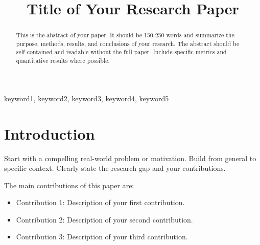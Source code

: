 \documentclass[10pt,conference]{IEEEtran}
\begin{document}
\title{Title of Your Research Paper}

\author{
\and
{}
}

\maketitle

\begin{abstract}
This is the abstract of your paper. It should be 150-250 words and summarize the 
purpose, methods, results, and conclusions of your research. The abstract should 
be self-contained and readable without the full paper. Include specific metrics 
and quantitative results where possible.
\end{abstract}

\begin{IEEEkeywords}
keyword1, keyword2, keyword3, keyword4, keyword5
\end{IEEEkeywords}

\IEEEpeerreviewmaketitle

\section{Introduction}
\label{sec:introduction}

Start with a compelling real-world problem or motivation. Build from general to 
specific context. Clearly state the research gap and your contributions.

The main contributions of this paper are:
\begin{itemize}
    \item Contribution 1: Description of your first contribution.
    \item Contribution 2: Description of your second contribution.
    \item Contribution 3: Description of your third contribution.
\end{itemize}
\end{document}
